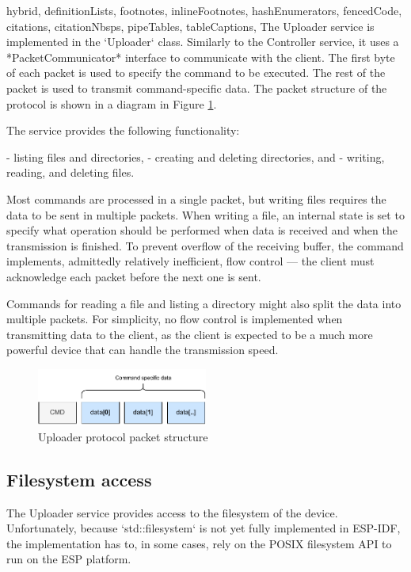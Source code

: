 \begin{markdown*}{%
  hybrid,
  definitionLists,
  footnotes,
  inlineFootnotes,
  hashEnumerators,
  fencedCode,
  citations,
  citationNbsps,
  pipeTables,
  tableCaptions,
}
The Uploader service is implemented in the `Uploader` class. Similarly to the Controller service, it uses a *PacketCommunicator* interface to communicate with the client. The first byte of each packet is used to specify the command to be executed. The rest of the packet is used to transmit command-specific data. The packet structure of the protocol is shown in a diagram in Figure \ref{fig:uploader-protocol}.

The service provides the following functionality:

  - listing files and directories,
  - creating and deleting directories, and
  - writing, reading, and deleting files.

Most commands are processed in a single packet, but writing files requires the data to be sent in multiple packets. When writing a file, an internal state is set to specify what operation should be performed when data is received and when the transmission is finished. To prevent overflow of the receiving buffer, the command implements, admittedly relatively inefficient, flow control --- the client must acknowledge each packet before the next one is sent.

Commands for reading a file and listing a directory might also split the data into multiple packets. For simplicity, no flow control is implemented when transmitting data to the client, as the client is expected to be a much more powerful device that can handle the transmission speed.

\begin{figure}[!ht]
    \centering
    \includegraphics[width=0.5\textwidth]{img/controller-packet}
    \caption{Uploader protocol packet structure}
    \label{fig:uploader-protocol}
\end{figure}

\subsection{Filesystem access}

The Uploader service provides access to the filesystem of the device. Unfortunately, because `std::filesystem` is not yet fully implemented in ESP-IDF, the implementation has to, in some cases, rely on the POSIX filesystem API to run on the ESP platform.



\end{markdown*}
